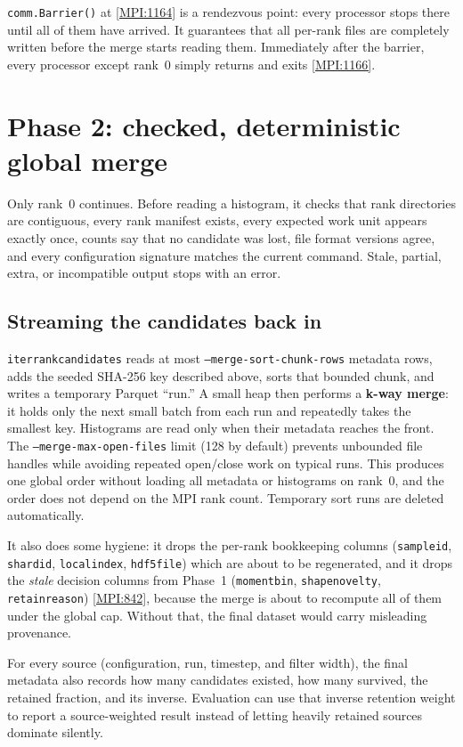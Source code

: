 \documentclass[11pt,a4paper]{report}
\newcommand{\srcbase}{vscode://file/Users/syellapa/Documents/Research/2026/ANSYS/Multi-ScalarPDF}
\newcommand{\srctag}[1]{{\footnotesize\textcolor{TagGray}{[#1]}}}
\newcommand{\MpiL}[1]{\href{\srcbase/EnsightPDFHybridDatasetMPI.py:#1}{\srctag{MPI:#1}}}
\newcommand{\code}[1]{\texttt{#1}}
\newcommand{\term}[1]{\textbf{#1}}
\renewcommand{\_}{\origtextunderscore\allowbreak}
\begin{document}
\code{comm.Barrier()} at \MpiL{1164} is a rendezvous point: every processor stops there until
all of them have arrived. It guarantees that all per-rank files are completely written before
the merge starts reading them. Immediately after the barrier, every processor except rank~0
simply returns and exits \MpiL{1166}.

\section{Phase 2: checked, deterministic global merge}

Only rank~0 continues. Before reading a histogram, it checks that rank directories are
contiguous, every rank manifest exists, every expected work unit appears exactly once, counts
say that no candidate was lost, file format versions agree, and every configuration signature
matches the current command. Stale, partial, extra, or incompatible output stops with an error.

\subsection*{Streaming the candidates back in}

\code{iter\_rank\_candidates} reads at most \code{--merge-sort-chunk-rows} metadata rows,
adds the seeded SHA-256 key described above, sorts that bounded chunk, and writes a temporary
Parquet ``run.'' A small heap then performs a \term{k-way merge}: it holds only the next small
batch from each run and repeatedly takes the smallest key. Histograms are read only when their
metadata reaches the front. The \code{--merge-max-open-files} limit (128 by default) prevents
unbounded file handles while avoiding repeated open/close work on typical runs. This produces
one global order without loading all metadata or histograms on rank~0, and the order does not
depend on the MPI rank count. Temporary sort runs are deleted automatically.

It also does some hygiene: it drops the per-rank bookkeeping columns
(\code{sample\_id}, \code{shard\_id}, \code{local\_index}, \code{hdf5\_file}) which are about
to be regenerated, and it drops the \emph{stale} decision columns from Phase~1
(\code{moment\_bin\_*}, \code{shape\_novelty}, \code{retain\_reason}) \MpiL{842}, because the
merge is about to recompute all of them under the global cap. Without that, the final dataset
would carry misleading provenance.

For every source (configuration, run, timestep, and filter width), the final metadata also
records how many candidates existed, how many survived, the retained fraction, and its inverse.
Evaluation can use that inverse retention weight to report a source-weighted result instead of
letting heavily retained sources dominate silently.
\end{document}
